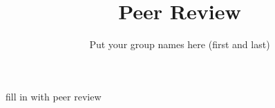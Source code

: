 \documentclass[manuscript,authorversion,nonacm]{acmart} %
\begin{document}
\title[Peer Review]{Peer Review}


\author{Put your group names here (first and last)}

\renewcommand{\shortauthors}{Short author names (just last names)}

\maketitle

fill in with peer review



\newpage




\newpage 
\appendix
\end{document}
